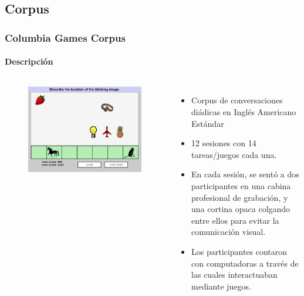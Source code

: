 \documentclass{beamer}
\begin{document}
\subsection{Corpus}
\begin{frame}
  \frametitle{Columbia Games Corpus}
  \framesubtitle{Descripción}
  \begin{columns}
      \begin{figure}
        \includegraphics[width=\textwidth]{images/columbia_games_color.jpg}
      \end{figure}


    \begin{itemize}
      \item Corpus de conversaciones diádicas en Inglés Americano Estándar
      \item 12 sesiones con 14 tareas/juegos cada una.
      \item En cada sesión, se sentó a dos participantes en una cabina profesional de grabación, y una cortina opaca colgando entre ellos para evitar la comunicación visual.
      \item Los participantes contaron con computadoras a través de las cuales interactuaban mediante juegos.
    \end{itemize}
  \end{columns}

\end{frame}
\end{document}
